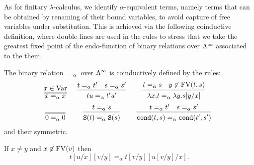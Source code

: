 As for finitary $\lambda$-calculus, we identify $\alpha$-equivalent terms, namely terms that can be obtained by renaming of their bound variables, to avoid capture of free variables under substitution. This is achieved via the following coinductive definition, where double lines are used in the rules to stress that we take the greatest fixed point of the endo-function of binary relations over $\Lambda^\infty$ associated to the them.

\begin{definition}\label{def:alpha-equivalence}
The binary relation $=_\alpha$ over $\Lambda^\infty$ is coinductively defined by the rules:
\[\begin{array}{ccc}
 \infer=[]{x =_\alpha x}{x \in \Var} &
 \infer=[]{tu =_\alpha t'u'}{t =_\alpha t' \quad s =_\alpha s'} &
 \infer=[]{\lambda x.t =_\alpha \lambda y. s[y/x]}{t =_\alpha s \quad y \not \in \FV(t,s)} \\[2mm]
 \infer=[]{0 =_\alpha 0}{} & 
 \infer=[]{\Succ(t) =_\alpha \Succ(s)}{t =_\alpha s} &
 \infer=[]{\cond(t, s) =_\alpha \cond(t', s')}{t =_\alpha t' \quad s =_\alpha s'}
\end{array}\]
and their symmetric.
\end{definition}

\vspace{1mm}
\begin{lemma}\label{lem:substitution-composition} 
If $x\neq y$ and $x \not \in {{\rm FV}}(v)$ then 
\[t[u/x][v/y] =_\alpha t[v/y][u[v/y]/x].\]
\end{lemma}

